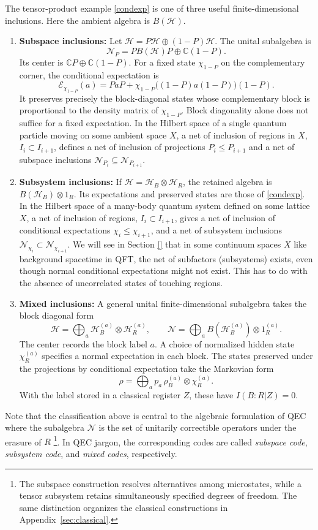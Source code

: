 \documentclass[a4paper,11pt]{article}
\theoremstyle{definition}
\newcommand{\mN}{\mathcal{N}}
\newcommand{\mE}{\mathcal{E}}
\begin{document}
The tensor-product example \eqref{condexp} is one of three useful finite-dimensional
inclusions. Here the ambient algebra is $B(\mathcal H)$.
\begin{enumerate}
 \item {\bf Subspace inclusions:} Let $\mathcal H=P\mathcal H\oplus(1-P)\mathcal H$.
 The unital subalgebra is
 \[
  \mN_P=P B(\mathcal H)P\oplus\mathbb C(1-P).
 \]
 Its center is $\mathbb CP\oplus\mathbb C(1-P)$. For a fixed state $\chi_{1-P}$
 on the complementary corner, the conditional expectation is
 \[
  \mE_{\chi_{1-P}}(a)=PaP+
  \chi_{1-P}\bigl((1-P)a(1-P)\bigr)(1-P).
 \]
 It preserves precisely the block-diagonal states whose complementary block
 is proportional to the density matrix of $\chi_{1-P}$.
 Block diagonality alone does not suffice for a fixed expectation.
In the Hilbert space of a single quantum particle moving on some ambient space $X$, a net of inclusion of regions in $X$, $I_i\subset I_{i+1}$, defines a net of inclusion of projections $P_i\leq P_{i+1}$ and a net of subspace inclusions $\mN_{P_i}\subseteq\mN_{P_{i+1}}$. 
 
 \item {\bf Subsystem inclusions:} If $\mathcal H=\mathcal H_B\otimes\mathcal H_R$,
 the retained algebra is $B(\mathcal H_B)\otimes1_R$.
 Its expectations and preserved states are those of \eqref{condexp}. In the Hilbert space of a many-body quantum system defined on some lattice $X$, a net of inclusion of regions, $I_i\subset I_{i+1}$, gives a net of inclusion of conditional expectations $\chi_i \leq\chi_{i+1}$, and a net of subsystem inclusions $\mN_{\chi_i}\subset \mN_{\chi_{i+1}}$. We will see in Section \ref{} that in some continuum spaces $X$ like background spacetime in QFT, the net of subfactors (subsystems) exists, even though normal conditional expectations might not exist. This has to do with the absence of uncorrelated states of touching regions.
 
 \item {\bf Mixed inclusions:} A general unital finite-dimensional subalgebra takes the block diagonal form
 \[
  \mathcal H=\bigoplus_a\mathcal H_B^{(a)}\otimes\mathcal H_R^{(a)},\qquad
  \mN=\bigoplus_a B(\mathcal H_B^{(a)})\otimes1_R^{(a)}.
 \]
 The center records the block label $a$. A choice of normalized hidden state $\chi_R^{(a)}$ specifies a normal
 expectation in each block. The states preserved under the projections by conditional expectation take the Markovian form
 \[
  \rho=\bigoplus_a p_a\,\rho_B^{(a)}\otimes\chi_R^{(a)}.
 \]
 With the label stored in a classical register $Z$, these have $I(B:R|Z)=0$.
\end{enumerate}
Note that the classification above is central to the algebraic formulation of QEC where the subalgebra $\mN$ is the set of unitarily correctible operators under the erasure of $R$ \cite{} \footnote{The subspace construction resolves alternatives among microstates, while a tensor
subsystem retains simultaneously specified degrees of freedom. The same distinction
organizes the classical constructions in Appendix~\ref{sec:classical}.
}. In QEC jargon, the corresponding codes are called {\it subspace code}, {\it subsystem code}, and {\it mixed codes}, respectively.
\end{document}
